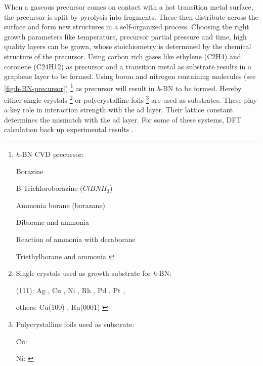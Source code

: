 When a gaseous precursor comes on contact with a hot transition metal surface, the precursor is split by pyrolysis into fragments. These then distribute across the surface and form new structures in a self-organized process. Choosing the right growth parameters like temperature, precursor partial pressure and time, high quality layers can be grown, whose stoichiometry is determined by the chemical structure of the precursor. Using carbon rich gases like ethylene (C2H4) \cite{ndiaye_structure_2008-1, coraux_growth_2009} and coronene (C24H12) \cite{coraux_growth_2009} as precursor and a transition metal as substrate results in a graphene layer to be formed. Using boron and nitrogen containing molecules (see \autoref{fig:h-BN-precursor})
\footnote{\textit{h}-BN CVD precursor:
	
	Borazine \cite{muller_epitaxial_2010, joshi_boron_2012, schwarz_corrugation_2017, li_grain_2015, preobrajenski_monolayer_2005, auwarter_xpd_1999, morscher_formation_2006, preobrajenski_monolayer_2007-1, corso_boron_2004, goriachko_self-assembly_2007, kidambi_situ_2014, kim_synthesis_2012}
	
	B-Trichloroborazine (${ClBNH}_3$) \cite{auwarter_synthesis_2004-1, muller_symmetry_2005}
	
	Ammonia borane (borazane) \cite{guo_controllable_2012-4, lee_large-scale_2012, kim_synthesis_2012-1} 
	
	Diborane and ammonia \cite{ismach_toward_2012}
	
	Reaction of ammonia with decaborane \cite{chatterjee_chemical_2011}
	
	Triethylborane and ammonia \cite{siegel_heterogeneous_2017}
} 
as precursor will result in \textit{h}-BN to be formed. Hereby either single crystals \footnote{Single crystals used as growth substrate for \textit{h}-BN:
	
	(111):
	Ag \cite{muller_epitaxial_2010}, 
	Cu \cite{joshi_boron_2012, schwarz_corrugation_2017, li_grain_2015, preobrajenski_monolayer_2005,siegel_heterogeneous_2017}, 
	Ni \cite{preobrajenski_monolayer_2005, nagashima_electronic_1995, auwarter_synthesis_2004-1, auwarter_xpd_1999}, 
	Rh \cite{preobrajenski_monolayer_2007-1, corso_boron_2004},
	Pd \cite{nagashima_electronic_1995, morscher_formation_2006}, 
	Pt \cite{nagashima_electronic_1995, preobrajenski_monolayer_2007-1, muller_symmetry_2005}, 
	
	others:
	Cu(100) \cite{guo_controllable_2012-4}, 
	Ru(0001) \cite{goriachko_self-assembly_2007, preobrajenski_monolayer_2007-1}
}
or polycrystalline foils \footnote{Polycrystalline foils used as substrate:
	
	Cu: \cite{kidambi_situ_2014, lee_large-scale_2012, kim_synthesis_2012, kim_synthesis_2012-1, ismach_toward_2012, guo_controllable_2012-4, chatterjee_chemical_2011}
	
	Ni: \cite{ismach_toward_2012, chatterjee_chemical_2011}
}
are used as substrates. These play a key role in interaction strength with the ad layer. Their lattice constant determines the mismatch with the ad layer. For some of these systems, DFT calculation back up experimental results \cite{gomez_diaz_hexagonal_2013}.


